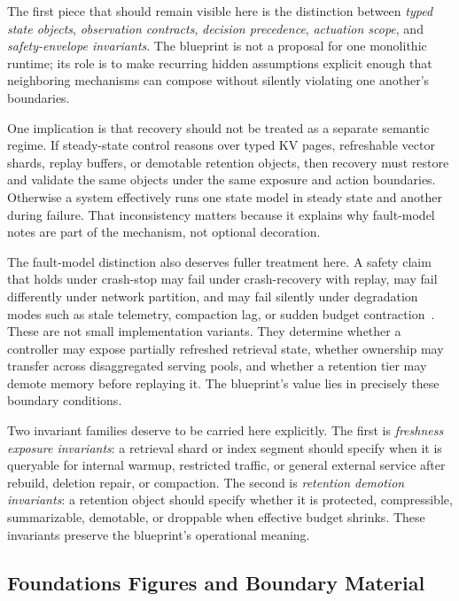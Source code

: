 The first piece that should remain visible here is the distinction between \emph{typed state objects}, \emph{observation contracts}, \emph{decision precedence}, \emph{actuation scope}, and \emph{safety-envelope invariants}. The blueprint is not a proposal for one monolithic runtime; its role is to make recurring hidden assumptions explicit enough that neighboring mechanisms can compose without silently violating one another's boundaries.

One implication is that recovery should not be treated as a separate semantic regime. If steady-state control reasons over typed KV pages, refreshable vector shards, replay buffers, or demotable retention objects, then recovery must restore and validate the same objects under the same exposure and action boundaries. Otherwise a system effectively runs one state model in steady state and another during failure. That inconsistency matters because it explains why fault-model notes are part of the mechanism, not optional decoration.

The fault-model distinction also deserves fuller treatment here. A safety claim that holds under crash-stop may fail under crash-recovery with replay, may fail differently under network partition, and may fail silently under degradation modes such as stale telemetry, compaction lag, or sudden budget contraction~\cite{chandy1985snapshot,corbett2012spanner,ongaro2014raft,mao2023morphstream,zhao2024recovery,wang2026candor,zhang2026flowrag}. These are not small implementation variants. They determine whether a controller may expose partially refreshed retrieval state, whether ownership may transfer across disaggregated serving pools, and whether a retention tier may demote memory before replaying it. The blueprint's value lies in precisely these boundary conditions.

Two invariant families deserve to be carried here explicitly. The first is \emph{freshness exposure invariants}: a retrieval shard or index segment should specify when it is queryable for internal warmup, restricted traffic, or general external service after rebuild, deletion repair, or compaction. The second is \emph{retention demotion invariants}: a retention object should specify whether it is protected, compressible, summarizable, demotable, or droppable when effective budget shrinks. These invariants preserve the blueprint's operational meaning.

\subsection{Foundations Figures and Boundary Material}

